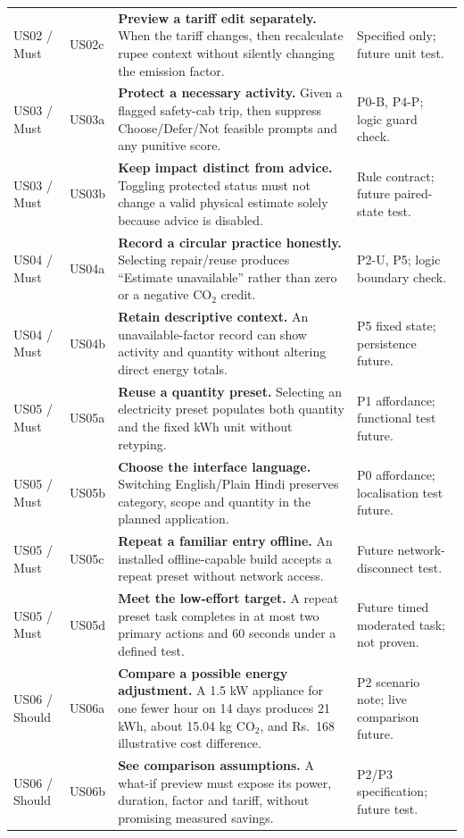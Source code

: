 \documentclass[12pt,a4paper]{article}
\begin{document}
\begin{longtable}{|>{\raggedright\arraybackslash}p{1.75cm}|>{\raggedright\arraybackslash}p{1.07cm}|>{\raggedright\arraybackslash}p{6.45cm}|>{\raggedright\arraybackslash}p{3.3cm}|}
US02 / Must & US02c & \textbf{Preview a tariff edit separately.} When the tariff changes, then recalculate rupee context without silently changing the emission factor. & Specified only; future unit test.\\
\rowcolor{RowGray}US03 / Must & US03a & \textbf{Protect a necessary activity.} Given a flagged safety-cab trip, then suppress Choose/Defer/Not feasible prompts and any punitive score. & P0-B, P4-P; logic guard check.\\
US03 / Must & US03b & \textbf{Keep impact distinct from advice.} Toggling protected status must not change a valid physical estimate solely because advice is disabled. & Rule contract; future paired-state test.\\
\rowcolor{RowGray}US04 / Must & US04a & \textbf{Record a circular practice honestly.} Selecting repair/reuse produces “Estimate unavailable” rather than zero or a negative CO$_2$ credit. & P2-U, P5; logic boundary check.\\
US04 / Must & US04b & \textbf{Retain descriptive context.} An unavailable-factor record can show activity and quantity without altering direct energy totals. & P5 fixed state; persistence future.\\
\rowcolor{RowGray}US05 / Must & US05a & \textbf{Reuse a quantity preset.} Selecting an electricity preset populates both quantity and the fixed kWh unit without retyping. & P1 affordance; functional test future.\\
US05 / Must & US05b & \textbf{Choose the interface language.} Switching English/Plain Hindi preserves category, scope and quantity in the planned application. & P0 affordance; localisation test future.\\
\rowcolor{RowGray}US05 / Must & US05c & \textbf{Repeat a familiar entry offline.} An installed offline-capable build accepts a repeat preset without network access. & Future network-disconnect test.\\
US05 / Must & US05d & \textbf{Meet the low-effort target.} A repeat preset task completes in at most two primary actions and 60 seconds under a defined test. & Future timed moderated task; not proven.\\
\rowcolor{RowGray}US06 / Should & US06a & \textbf{Compare a possible energy adjustment.} A 1.5 kW appliance for one fewer hour on 14 days produces 21 kWh, about 15.04 kg CO$_2$, and Rs.~168 illustrative cost difference. & P2 scenario note; live comparison future.\\
US06 / Should & US06b & \textbf{See comparison assumptions.} A what-if preview must expose its power, duration, factor and tariff, without promising measured savings. & P2/P3 specification; future test.\\

\end{longtable}
\end{document}
